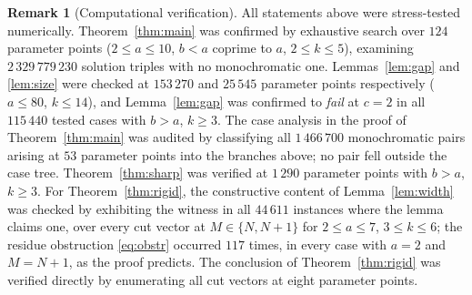 \documentclass{amsart}
\theoremstyle{definition}
\newtheorem{remark}[theorem]{Remark}
\begin{document}
\begin{remark}[Computational verification]
All statements above were stress-tested numerically.  Theorem~\ref{thm:main} was
confirmed by exhaustive search over $124$ parameter points ($2\le a\le10$,
$b<a$ coprime to $a$, $2\le k\le5$), examining $2\,329\,779\,230$ solution
triples with no monochromatic one.  Lemmas~\ref{lem:gap} and \ref{lem:size} were
checked at $153\,270$ and $25\,545$ parameter points respectively ($a\le80$,
$k\le14$), and Lemma~\ref{lem:gap} was confirmed to \emph{fail} at $c=2$ in all
$115\,440$ tested cases with $b>a$, $k\ge3$.  The case analysis in the proof of
Theorem~\ref{thm:main} was audited by classifying all $1\,466\,700$
monochromatic pairs arising at $53$ parameter points into the branches above; no
pair fell outside the case tree.  Theorem~\ref{thm:sharp} was verified at
$1\,290$ parameter points with $b>a$, $k\ge3$.  For Theorem~\ref{thm:rigid}, the
constructive content of Lemma~\ref{lem:width} was checked by exhibiting the
witness in all $44\,611$ instances where the lemma claims one, over every cut
vector at $M\in\{N,N+1\}$ for $2\le a\le7$, $3\le k\le6$; the residue
obstruction \eqref{eq:obstr} occurred $117$ times, in every case with $a=2$ and
$M=N+1$, as the proof predicts.  The conclusion of Theorem~\ref{thm:rigid} was
verified directly by enumerating all cut vectors at eight parameter points.
\end{remark}
\end{document}
